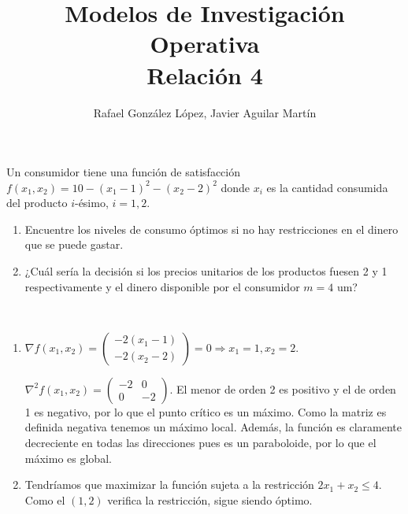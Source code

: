 \documentclass[twoside]{article}
\begin{document}
\title{Modelos de Investigación Operativa\\ Relación 4}
\author{Rafael González López, Javier Aguilar Martín}
\date{}
\maketitle

\begin{ejercicio}{1}
Un consumidor tiene una función de satisfacción $f(x_1,x_2)=10-(x_1-1)^2-(x_2-2)^2$ donde $x_i$ es la cantidad consumida del producto $i$-ésimo, $i=1,2$.
\begin{enumerate}
\item Encuentre los niveles de consumo óptimos si no hay restricciones en el dinero que se puede gastar.
\item ¿Cuál sería la decisión si los precios unitarios de los productos fuesen 2 y 1 respectivamente y el dinero disponible por el consumidor $m=4$ um?
\end{enumerate}
\begin{solucion}\
\begin{enumerate}
\item $\nabla f(x_1,x_2)=\begin{pmatrix}
-2(x_1-1)\\
-2(x_2-2)
\end{pmatrix}=0\Rightarrow x_1=1, x_2=2$. 

$\nabla^2f(x_1,x_2)=\begin{pmatrix}
-2 & 0\\
0  & -2
\end{pmatrix}$. El menor de orden 2 es positivo y el de orden 1 es negativo, por lo que el punto crítico es un máximo. Como la matriz es definida negativa tenemos un máximo local. Además, la función es claramente decreciente en todas las direcciones pues es un paraboloide, por lo que el máximo es global. 
\item Tendríamos que maximizar la función sujeta a la restricción $2x_1+x_2\leq 4$. Como el $(1,2)$ verifica la restricción, sigue siendo óptimo.
\end{enumerate}
\end{solucion}
\end{ejercicio}
\end{document}
